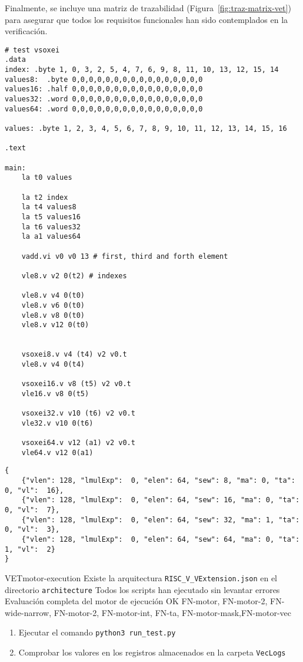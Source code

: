 Finalmente, se incluye una matriz de trazabilidad (Figura~\ref{fig:traz-matrix-vet}) para asegurar que todos los requisitos funcionales han sido contemplados en la verificación.

\begin{lstlisting}[caption=Ejemplo de prueba en ensamblador, label=example-assembly]
# test vsoxei
.data
index: .byte 1, 0, 3, 2, 5, 4, 7, 6, 9, 8, 11, 10, 13, 12, 15, 14
values8:  .byte 0,0,0,0,0,0,0,0,0,0,0,0,0,0,0,0 
values16: .half 0,0,0,0,0,0,0,0,0,0,0,0,0,0,0,0 
values32: .word 0,0,0,0,0,0,0,0,0,0,0,0,0,0,0,0
values64: .word 0,0,0,0,0,0,0,0,0,0,0,0,0,0,0,0

values: .byte 1, 2, 3, 4, 5, 6, 7, 8, 9, 10, 11, 12, 13, 14, 15, 16

.text

main: 
    la t0 values

    la t2 index
    la t4 values8
    la t5 values16
    la t6 values32
    la a1 values64

    vadd.vi v0 v0 13 # first, third and forth element

    vle8.v v2 0(t2) # indexes

    vle8.v v4 0(t0) 
    vle8.v v6 0(t0) 
    vle8.v v8 0(t0) 
    vle8.v v12 0(t0)


    vsoxei8.v v4 (t4) v2 v0.t
    vle8.v v4 0(t4)

    vsoxei16.v v8 (t5) v2 v0.t
    vle16.v v8 0(t5)

    vsoxei32.v v10 (t6) v2 v0.t
    vle32.v v10 0(t6)

    vsoxei64.v v12 (a1) v2 v0.t
    vle64.v v12 0(a1)
\end{lstlisting}

\begin{lstlisting}[caption=Arquitecturas empleadas para la evaluación en forma de JSON, label=arquitecturas-test]
{
    {"vlen": 128, "lmulExp":  0, "elen": 64, "sew": 8, "ma": 0, "ta": 0, "vl":  16},
    {"vlen": 128, "lmulExp":  0, "elen": 64, "sew": 16, "ma": 0, "ta": 0, "vl":  7},
    {"vlen": 128, "lmulExp":  0, "elen": 64, "sew": 32, "ma": 1, "ta": 0, "vl":  3},
    {"vlen": 128, "lmulExp":  0, "elen": 64, "sew": 64, "ma": 0, "ta": 1, "vl":  2}
}
\end{lstlisting}

\begin{testCase}{VET}{motor-execution}
    {Existe la arquitectura \texttt{RISC\_V\_VExtension.json} en el directorio \texttt{architecture}} %
    {Todos los scripts han ejecutado sin levantar errores}
    {Evaluación completa del motor de ejecución} %
    {OK} %
    {FN-motor, FN-motor-2, FN-wide-narrow, FN-motor-2, FN-motor-int, FN-ta, FN-motor-mask,FN-motor-vec} %
    \begin{enumerate}
        \item Ejecutar el comando \texttt{python3 run\_test.py}
        \item Comprobar los valores en los registros almacenados en la carpeta \texttt{VecLogs}
    \end{enumerate}
\end{testCase}


